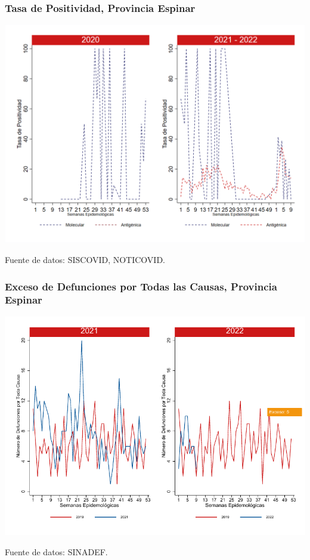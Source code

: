 \documentclass[xcolor=table]{beamer}
\begin{document}
\begin{frame}
	\frametitle{Tasa de Positividad, Provincia Espinar}
	\vspace{-.5cm}
	\begin{center}
		\includegraphics[width=0.8\linewidth, trim={0cm .5cm 0cm 0.2cm},clip]{../figuras/positividad_20_21_8.png}
	\end{center}
	{\tiny Fuente de datos: SISCOVID, NOTICOVID.}
\end{frame}

\begin{frame}
	\frametitle{Exceso de Defunciones por Todas las Causas, Provincia Espinar}
	\vspace{-.5cm}
	\begin{center}
		\includegraphics[width=0.8\linewidth, trim={0cm .5cm 0cm 0.2cm},clip]{../figuras/exceso_8.pdf}
	\end{center}
	{\tiny Fuente de datos: SINADEF.}
	
	\hyperlink{indicadores_provinciales}{}
\end{frame}
\end{document}
